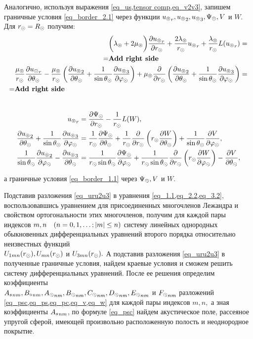Аналогично, используя выражения \cref{eq_us,tensor comp,eq_v2v3}, запишем граничные условия \cref{eq_border_2.1} через функции ${u\l}_r, {u\l}_2, {u\l}_3, \P\s, V$ и $W.$ Для $r\s = R\s$ получим:
\begin{align}
\begin{split}
&\biggl(\la\l+2\mu\l\biggr)\fr{\de {u\l}_r}{\de r\s} + \fr{2\la\l}{r\s}{u\l}_r + \fr{\la\l}{r\s}L({u\l}_r) = \\
= &\text{\todo{Add right side}}
\end{split}\\
\begin{split}
&\fr{\mu\l}{r\s}\fr{\de{u\s}_r}{\de \Q\s} - \fr{\mu\l}{r\s}\left( \df{\de {u\l}_2}{\de\Q\s} + \fr1{\sin\Q\s}\fr{\de {u\l}_3}{\de\f\s} \right) + \mu\l\fr{\de}{\de r\s} \left(\df{\de {u\l}_2}{\de\Q\s} + \fr1{\sin\Q\s}\fr{\de {u\l}_3}{\de\f\s}\right) = \\
= &\text{\todo{Add right side}}
\end{split}
\end{align}\\
\begin{align}
{u\l}_r &= \fr{\de \P\s}{\de r\s} - \fr{1}{r\s}L(W),\\
\df{\de {u\l}_2}{\de\Q\s} + \fr1{\sin\Q\s}\fr{\de {u\l}_3}{\de\f\s} &= \fr{1}{r\s}\fr{\de \P\s}{\de \Q\s} + \fr{1}{r\s}\fr{\de}{\de r\s}\left(r\s\fr{\de W}{\de \Q\s}\right) + \fr{1}{\sin\Q\s}\fr{\de V}{\de\f\s},\\
\df1{\sin\Q\s}\df{\de {u\l}_2}{\de\f\s} - \df{\de {u\l}_3}{\de\Q\s} &= \fr{1}{r\s \sin\Q\s}\fr{\de \P\s}{\de \f\s} + \fr{1}{r\s\sin\Q\s}\fr{\de}{\de r\s}\left(r\s\fr{\de W}{\de \f\s}\right) - \fr{\de V}{\de \Q\s},
\end{align}

 а граничные условия \cref{eq_border_1.1} через $\P\s, V$ и $W.$

Подставив разложения \cref{eq_uru2u3} в уравнения \cref{eq_1.1,eq_2.2,eq_3.2}, воспользовавшись уравнением для присоединенных многочленов Лежандра и свойством ортогональности этих многочленов, получим для каждой пары индексов $m,n \q(n = 0,1,\ldots; \lvert m\rvert\leq n)$ систему линейных однородных обыкновенных дифференциальных уравнений второго порядка относительно неизвестных функций \\ $U_{1mn}(r\s), U_{mn}(r\s)$ и $U_{3mn}(r\s).$ А подставив разложения \cref{eq_uru2u3} в полученные граничные условия, найдем краевые условия и сможем решить  систему дифференциальных уравнений. После ее решения определим коэффициенты \\
${A\sc}_{nm}, {B\c}_{nm}, {A\s}_{nm}, {B\s}_{nm}, {C\s}_{nm}, {D\s}_{nm}, {E\s}_{nm}$ и $ {F\s}_{nm}$ разложений  \cref{eq_psc,eq_ps,eq_pc,eq_v,eq_w} для каждой пары индексов $m,n,$ а зная коэффициенты ${A\sc}_{nm}$, по формуле \cref{eq_psc} найдем акустическое поле, рассеяное упругой сферой, имеющей произвольно расположенную полость и неоднородное покрытие.

